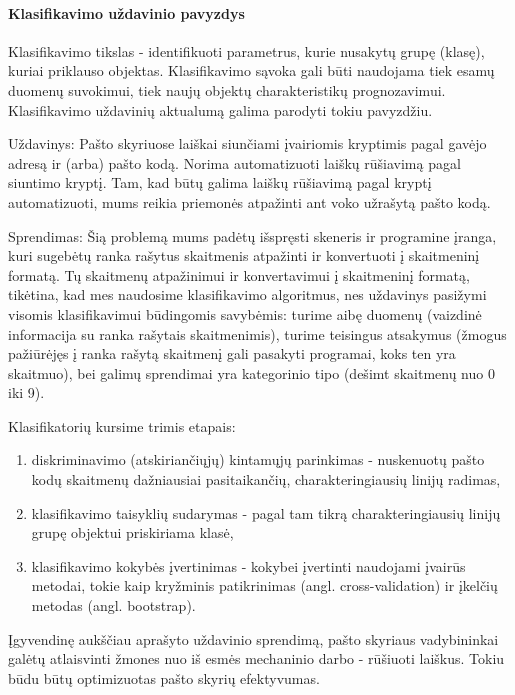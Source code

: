 \paragraph{Klasifikavimo uždavinio pavyzdys}

Klasifikavimo tikslas - identifikuoti parametrus, kurie nusakytų grupę (klasę),
kuriai priklauso objektas. Klasifikavimo sąvoka gali būti naudojama tiek esamų
duomenų suvokimui, tiek naujų objektų charakteristikų prognozavimui.
Klasifikavimo uždavinių aktualumą galima parodyti tokiu pavyzdžiu.

Uždavinys: Pašto skyriuose laiškai siunčiami įvairiomis kryptimis pagal gavėjo
adresą ir (arba) pašto kodą. Norima automatizuoti laiškų rūšiavimą pagal
siuntimo kryptį. Tam, kad būtų galima laiškų rūšiavimą pagal kryptį
automatizuoti, mums reikia priemonės atpažinti ant voko užrašytą
pašto kodą.

Sprendimas: Šią problemą mums padėtų išspręsti skeneris ir programine įranga,
kuri sugebėtų ranka rašytus skaitmenis atpažinti ir konvertuoti į skaitmeninį
formatą. Tų skaitmenų atpažinimui ir konvertavimui į skaitmeninį formatą,
tikėtina, kad mes naudosime klasifikavimo algoritmus, nes uždavinys pasižymi
visomis klasifikavimui būdingomis savybėmis: turime aibę duomenų (vaizdinė
informacija su ranka rašytais skaitmenimis), turime teisingus atsakymus (žmogus
pažiūrėjęs į ranka rašytą skaitmenį gali pasakyti programai, koks ten yra
skaitmuo), bei galimų sprendimai yra kategorinio tipo (dešimt skaitmenų nuo
0 iki 9).

Klasifikatorių kursime trimis etapais:
\begin{enumerate}
  \item diskriminavimo (atskiriančiųjų) kintamųjų parinkimas - nuskenuotų
  pašto kodų skaitmenų dažniausiai pasitaikančių, charakteringiausių linijų
  radimas,
  \item klasifikavimo taisyklių sudarymas - pagal tam tikrą charakteringiausių
  linijų grupę objektui priskiriama klasė,
  \item klasifikavimo kokybės įvertinimas - kokybei įvertinti naudojami įvairūs
  metodai, tokie kaip kryžminis patikrinimas (angl. cross-validation) ir
  įkelčių metodas (angl. bootstrap).
\end{enumerate}

Įgyvendinę aukščiau aprašyto uždavinio sprendimą, pašto skyriaus vadybininkai
galėtų atlaisvinti žmones nuo iš esmės mechaninio darbo - rūšiuoti laiškus.
Tokiu būdu būtų optimizuotas pašto skyrių efektyvumas.

